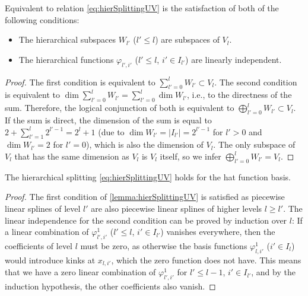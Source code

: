 \begin{lemma}
  \label{lemma:hierSplittingUV}
  Equivalent to relation \eqref{eq:hierSplittingUV} is the satisfaction of
  both of the following conditions:
  \begin{itemize}
    \item
    The hierarchical subspaces $W_{l'}$ ($l' \le l$) are subspaces of $V_l$.
    
    \item
    The hierarchical functions
    $\varphi_{l',i'}$ ($l' \le l$, $i' \in I_{l'}$) are linearly independent.
  \end{itemize}
\end{lemma}
\begin{proof}
  The first condition is equivalent to $\sum_{l'=0}^l W_{l'} \subset V_l$.
  The second condition is equivalent to
  $\dim \sum_{l'=0}^l W_{l'} = \sum_{l'=0}^l \dim W_{l'}$,
  i.e., to the directness of the sum.
  Therefore, the logical conjunction of both is equivalent to
  $\bigoplus_{l'=0}^l W_{l'} \subset V_l$.
  If the sum is direct,
  the dimension of the sum is equal to $2 + \sum_{l'=1}^l 2^{l'-1} = 2^l + 1$
  (due to $\dim W_{l'} = |I_{l'}| = 2^{l'-1}$ for $l' > 0$ and
  $\dim W_{l'} = 2$ for $l' = 0$),
  which is also the dimension of $V_l$.
  The only subspace of $V_l$ that has the same dimension as $V_l$ is $V_l$ itself,
  so we infer $\bigoplus_{l'=0}^l W_{l'} = V_l$.
\end{proof}
\begin{corollary}
  The hierarchical splitting \eqref{eq:hierSplittingUV}
  holds for the hat function basis.
\end{corollary}
\begin{proof}
  The first condition of \cref{lemma:hierSplittingUV}
  is satisfied as piecewise linear splines of level $l'$
  are also piecewise linear splines of higher levels $l \ge l'$.
  The linear independence for the second condition can be proved by induction
  over $l$:
  If a linear combination of $\varphi_{l',i'}^1$ ($l' \le l$, $i' \in I_{l'}$)
  vanishes everywhere, then the coefficients of level $l$ must be zero,
  as otherwise the basis functions $\varphi_{l,i'}^1$ ($i' \in I_l$) would
  introduce kinks at $x_{l,i'}$, which the zero function does not have.
  This means that we have a zero linear combination of $\varphi_{l',i'}^1$ for
  $l' \le l - 1$, $i' \in I_{l'}$,
  and by the induction hypothesis, the other coefficients also vanish.
\end{proof}

